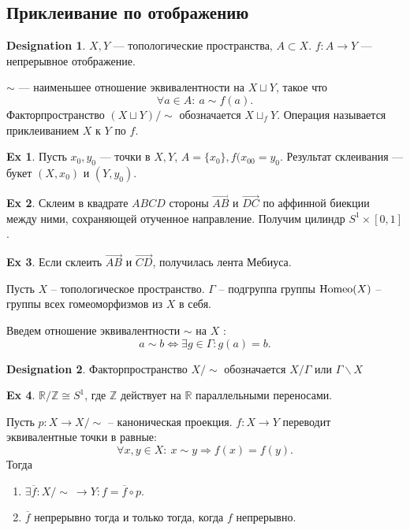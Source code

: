 \documentclass[11pt]{book}
\newcommand{\Z}{\mathbb{Z}}
\newcommand{\R}{\mathbb{R}}
\theoremstyle{definition}
\theoremstyle{plain}
\theoremstyle{plain}
\theoremstyle{definition}
\newtheorem*{ex}{Ex}
\newtheorem*{name}{Designation}
\theoremstyle{remark}
\begin{document}
\subsection{Приклеивание по отображению}
\begin{name}
    $ X, Y$ ---  топологические пространства, $ A \subset X$.
    $ f: A \to  Y$ --- непрерывное отображение.
\end{name}
\begin{defn}
    $ \sim $ --- наименьшее отношение эквивалентности на $ X \sqcup Y$, такое что \[
	\forall a \in  A: ~a \sim f(a)
    .\]
    Факторпространство $ (X \sqcup Y) / \!\sim $ обозначается $ X \sqcup_f Y$. Операция называется приклеиванием  $ X$ к  $ Y$ по  $ f$.
\end{defn}
\begin{ex}
    Пусть $ x_0, y_0$ --- точки в $ X, Y$,  $ A = \{x_0\}, f(x_{00} = y_0$.
    Результат склеивания --- {\sf букет} $ (X, x_0)$ и $(Y, y_0)$.
\end{ex}
\begin{ex}
    Склеим в квадрате $ ABCD$ стороны  $\overrightarrow{AB}$ и $ \overrightarrow{DC}$ по аффинной биекции между ними, сохраняющей отученное направление. Получим цилиндр $ S^{1} \times [0, 1]$.
\end{ex}
\begin{ex}
    Если склеить $ \overrightarrow{AB}$ и $ \overrightarrow{CD}$, получилась  { \sf лента Мебиуса}.
\end{ex}
\begin{defn}
    Пусть $ X $ -- топологическое пространство. $ \Gamma$ -- подгруппа группы $ {\rm Homeo}(X)$ -- группы всех гомеоморфизмов из $ X$ в себя.

    Введем отношение эквивалентности $ \sim $ на $ X$ :
    \[
	a \sim b \Longleftrightarrow \exists  g \in  \Gamma : g(a) = b
    .\]
    \begin{name}
	Факторпространство $ X /\sim $  обозначается $ X / \Gamma$ или $ \Gamma \backslash X$
    \end{name}
\end{defn}
\begin{ex}
    $ \R / \Z \cong S^{1}$, где $ \Z$ действует на $ \R$  параллельными переносами.
\end{ex}
\begin{thm}\label{th_gomeo}
    Пусть $ p : X \to  X/ \!\sim $ -- каноническая проекция. $ f: X \to  Y$ переводит эквивалентные точки в равные:
    \[
	\forall  x, y \in  X: ~ x \sim y \Longrightarrow f(x) = f(y)
    .\]
    Тогда
    \begin{enumerate}
	\item $ \exists  \overline{f}: X /\!\sim~ \to  Y: f = \overline{f} \circ p$.
	\item  $ \overline{f}$ непрерывно тогда и только тогда, когда  $ f$ непрерывно.
    \end{enumerate}
\end{thm}
\end{document}
